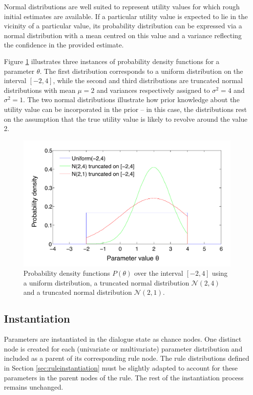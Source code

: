 Normal distributions are well suited to represent utility values for which rough initial estimates are available. If a particular utility value is expected to lie in the vicinity of a particular value, its probability distribution can be expressed via a normal distribution with a mean centred on this value and a variance reflecting the confidence in the provided estimate. 

Figure \ref{fig:uniformn} illustrates three instances of probability density functions for a parameter $\theta$.  The first distribution corresponds to a uniform distribution on the interval $[-2,4]$, while the second and third distributions are truncated normal distributions with mean $\mu=2$ and variances respectively assigned to $\sigma^2=4$ and $\sigma^2=1$. The two normal distributions illustrate how prior knowledge about the utility value can be incorporated in the prior -- in this case, the distributions rest on the assumption that the true utility value is likely to revolve around the value 2. 

\begin{figure}[ht]
\centering
\includegraphics[scale=0.45]{imgs/uniformn.pdf}
\caption{Probability density functions $P(\theta)$ over the interval $[-2,4]$ using a uniform distribution, a truncated normal distribution $\mathcal{N}(2,4)$ and a truncated normal distribution $\mathcal{N}(2,1)$.} 
\label{fig:uniformn}
\end{figure}

\subsection{Instantiation}
\label{sec:rule-params-instantiation}

Parameters are instantiated in the dialogue state as chance nodes.  One distinct node is created for each (univariate or multivariate) parameter distribution and included as a parent of its corresponding rule node. The rule distributions defined in Section \ref{sec:ruleinstantiation} must be slightly adapted to account for these parameters in the parent nodes of the rule.  The rest of the instantiation process remains unchanged. 

